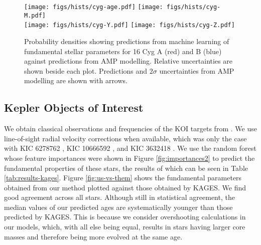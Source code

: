 \documentclass[iop,apj,twocolappendix]{emulateapj}
\begin{document}
\begin{figure*}
    \centering
    \texttt{[image: figs/hists/cyg-age.pdf]}\hfill
    \texttt{[image: figs/hists/cyg-M.pdf]}\\
    \texttt{[image: figs/hists/cyg-Y.pdf]}\hfill
    \texttt{[image: figs/hists/cyg-Z.pdf]}
    \caption{Probability densities showing predictions from machine learning of fundamental stellar parameters for 16 Cyg A (red) and B (blue) against predictions from AMP modelling. Relative uncertainties are shown beside each plot. Predictions and $2\sigma$ uncertainties from AMP modelling are shown with arrows.}
    \label{fig:16Cyg-hist}
\end{figure*}


\subsection{Kepler Objects of Interest}
We obtain classical observations and frequencies of the KOI targets from \citet[hereafter KAGES]{2015MNRAS.452.2127S}. We use line-of-sight radial velocity corrections when available, which was only the case with KIC 6278762 \citep{2002AJ....124.1144L}, KIC 10666592 \citep{2013A&A...554A..84M}, and KIC 3632418 \citep{2006AstL...32..759G}. We use the random forest whose feature importances were shown in Figure \ref{fig:importances2} to predict the fundamental properties of these stars, the results of which can be seen in Table \ref{tab:results-kages}. Figure \ref{fig:us-vs-them} shows the fundamental parameters obtained from our method plotted against those obtained by KAGES. We find good agreement across all stars. Although still in statistical agreement, the median values of our predicted ages are systematically younger than those predicted by KAGES. This is because we consider overshooting calculations in our models, which, with all else being equal, results in stars having larger core masses and therefore being more evolved at the same age. 
\end{document}
